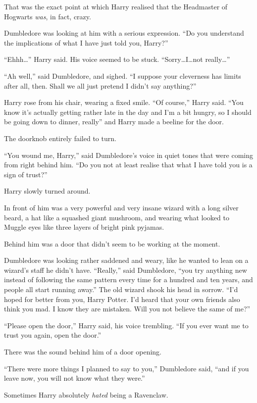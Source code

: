That was the exact point at which Harry realised that the Headmaster of Hogwarts \emph{was}, in fact, crazy.

Dumbledore was looking at him with a serious expression.
“Do you understand the implications of what I have just told you, Harry?”

“Ehhh…” Harry said. His voice seemed to be stuck.
“Sorry…I…not really…”

“Ah well,” said Dumbledore, and sighed.
“I suppose your cleverness has limits after all, then. Shall we all just pretend I didn’t say anything?”

Harry rose from his chair, wearing a fixed smile.
“Of course,” Harry said.
“You know it’s actually getting rather late in the day and I’m a bit hungry, so I should be going down to dinner, really” and Harry made a beeline for the door.

The doorknob entirely failed to turn.

“You wound me, Harry,” said Dumbledore’s voice in quiet tones that were coming from right behind him.
“Do you not at least realise that what I have told you is a sign of trust?”

Harry slowly turned around.

In front of him was a very powerful and very insane wizard with a long silver beard, a hat like a squashed giant mushroom, and wearing what looked to Muggle eyes like three layers of bright pink pyjamas.

Behind him was a door that didn’t seem to be working at the moment.

Dumbledore was looking rather saddened and weary, like he wanted to lean on a wizard’s staff he didn’t have.
“Really,” said Dumbledore, “you try anything new instead of following the same pattern every time for a hundred and ten years, and people all start running away.” The old wizard shook his head in sorrow.
“I’d hoped for better from you, Harry Potter. I’d heard that your own friends also think you mad. I know they are mistaken. Will you not believe the same of me?”

“Please open the door,” Harry said, his voice trembling.
“If you ever want me to trust you again, open the door.”

There was the sound behind him of a door opening.

“There were more things I planned to say to you,” Dumbledore said, “and if you leave now, you will not know what they were.”

Sometimes Harry absolutely \emph{hated} being a Ravenclaw.

